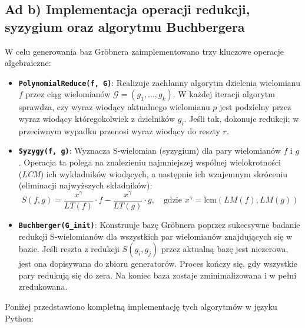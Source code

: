 \documentclass[12pt,a4paper]{article}
\begin{document}
\subsection{Ad b) Implementacja operacji redukcji, syzygium oraz algorytmu Buchbergera}

W celu generowania baz Gröbnera zaimplementowano trzy kluczowe operacje algebraiczne:
\begin{itemize}
    \item \textbf{\texttt{PolynomialReduce(f, G)}}: Realizuje zachłanny algorytm dzielenia wielomianu $f$ przez ciąg wielomianów $\mathcal{G} = (g_1, \dots, g_k)$. W każdej iteracji algorytm sprawdza, czy wyraz wiodący aktualnego wielomianu $p$ jest podzielny przez wyraz wiodący któregokolwiek z dzielników $g_i$. Jeśli tak, dokonuje redukcji; w przeciwnym wypadku przenosi wyraz wiodący do reszty $r$.
    \item \textbf{\texttt{Syzygy(f, g)}}: Wyznacza S-wielomian (syzygium) dla pary wielomianów $f$ i $g$. Operacja ta polega na znalezieniu najmniejszej wspólnej wielokrotności (\textit{LCM}) ich wykładników wiodących, a następnie ich wzajemnym skróceniu (eliminacji najwyższych składników):
    \begin{equation}
        S(f,g) = \frac{x^\gamma}{LT(f)}\cdot f - \frac{x^\gamma}{LT(g)}\cdot g, \quad \text{gdzie } x^\gamma = \text{lcm}(LM(f), LM(g))
    \end{equation}
    \item \textbf{\texttt{Buchberger(G\_init)}}: Konstruuje bazę Gröbnera poprzez sukcesywne badanie redukcji S-wielomianów dla wszystkich par wielomianów znajdujących się w bazie. Jeśli reszta z redukcji $S(g_i, g_j)$ przez aktualną bazę jest niezerowa, jest ona dopisywana do zbioru generatorów. Proces kończy się, gdy wszystkie pary redukują się do zera. Na koniec baza zostaje zminimalizowana i w pełni zredukowana.
\end{itemize}


\noindent Poniżej przedstawiono kompletną implementację tych algorytmów w języku Python:
\end{document}
